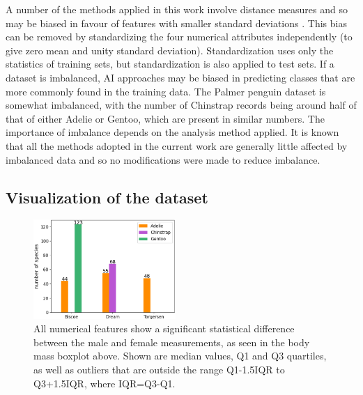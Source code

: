 \documentclass[12pt]{article}
\begin{document}
A number of the methods applied in this work involve distance measures 
and so may be biased in favour of features with smaller standard deviations \cite{hastie2009elements}. 
This bias can be removed by standardizing the four numerical attributes independently 
(to give zero mean and unity standard deviation). 
Standardization uses only the statistics of training sets, 
but standardization is also applied to test sets. If a dataset is imbalanced, 
AI approaches may be biased in predicting classes that are more commonly found in the training data. 
The Palmer penguin dataset is somewhat imbalanced, 
with the number of Chinstrap records being around half of that of either Adelie or Gentoo, 
which are present in similar numbers. 
The importance of imbalance depends on the analysis method applied. 
It is known that all the methods adopted in the current work are generally little affected by imbalanced data \cite{he2009learning} 
and so no modifications were made to reduce imbalance.

\vspace{\baselineskip}
\subsection*{Visualization of the dataset}

\begin{figure} %
  \centering
  \vspace{-0.5\baselineskip} %
  \includegraphics[width=0.48\textwidth]{islands.png} %
  \vspace{-0.5\baselineskip} %
  \caption{All numerical features show a significant statistical difference between the male and female measurements, as seen in the body mass boxplot above. Shown are median values, Q1 and Q3 quartiles, as well as outliers that are outside the range Q1-1.5IQR to Q3+1.5IQR, where IQR=Q3-Q1.}
  \vspace{-0.5\baselineskip} %
  \label{fig:islands}
\end{figure}
\end{document}
